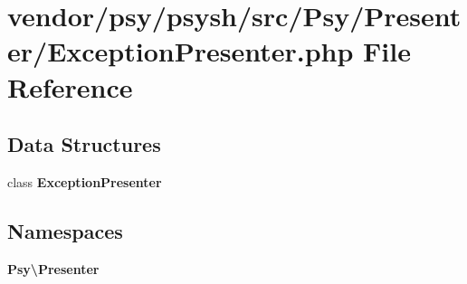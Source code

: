 \section{vendor/psy/psysh/src/\+Psy/\+Presenter/\+Exception\+Presenter.php File Reference}
\label{_exception_presenter_8php}
\subsection*{Data Structures}
\begin{DoxyCompactItemize}
\item 
class {\bf Exception\+Presenter}
\end{DoxyCompactItemize}
\subsection*{Namespaces}
\begin{DoxyCompactItemize}
\item 
 {\bf Psy\textbackslash{}\+Presenter}
\end{DoxyCompactItemize}
